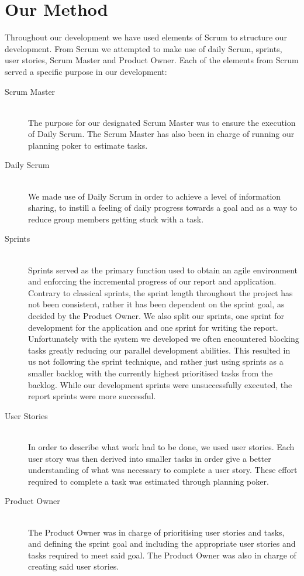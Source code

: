 \section{Our Method}
Throughout our development we have used elements of Scrum to structure our development.
From Scrum we attempted to make use of daily Scrum, sprints, user stories, Scrum Master and Product Owner.
Each of the elements from Scrum served a specific purpose in our development:
\begin{description}
    \item [Scrum Master] \hfill \\
    The purpose for our designated Scrum Master was to ensure the execution of Daily Scrum.
    The Scrum Master has also been in charge of running our planning poker to estimate tasks.
    \item [Daily Scrum] \hfill \\
    We made use of Daily Scrum in order to achieve a level of information sharing, to instill a feeling of daily progress towards a goal and as a way to reduce group members getting stuck with a task.
    \item [Sprints] \hfill \\
    Sprints served as the primary function used to obtain an agile environment and enforcing the incremental progress of our report and application.
    Contrary to classical sprints, the sprint length throughout the project has not been consistent, rather it has been dependent on the sprint goal, as decided by the Product Owner.
    We also split our sprints, one sprint for development for the application and one sprint for writing the report.
    Unfortunately with the system we developed we often encountered blocking tasks greatly reducing our parallel development abilities.
    This resulted in us not following the sprint technique, and rather just using sprints as a smaller backlog with the currently highest prioritised tasks from the backlog.
    While our development sprints were unsuccessfully executed, the report sprints were more successful.
    \item [User Stories] \hfill \\
    In order to describe what work had to be done, we used user stories.
    Each user story was then derived into smaller tasks in order give a better understanding of what was necessary to complete a user story.
    These effort required to complete a task was estimated through planning poker.
    \item [Product Owner] \hfill \\
    The Product Owner was in charge of prioritising user stories and tasks, and defining the sprint goal and including the appropriate user stories and tasks required to meet said goal.
    The Product Owner was also in charge of creating said user stories.
\end{description}
